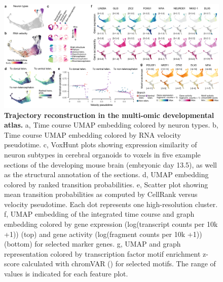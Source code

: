 \begin{figure}[h!]
    \centering
	\includegraphics[width=\textwidth]{figures/pando/Figure_S4}
    \caption{\textbf{Trajectory reconstruction in the multi-omic developmental atlas.} a, Time course UMAP embedding colored by neuron types. b, Time course UMAP embedding colored by RNA velocity pseudotime. c, VoxHunt plots showing expression similarity of neuron subtypes in cerebral organoids to voxels in five example sections of the developing mouse brain (embryonic day 13.5),  as well as the structural annotation of the sections. d, UMAP embedding colored by ranked transition probabilities. e, Scatter plot showing mean transition probabilities as computed by CellRank versus velocity pseudotime. Each dot represents one high-resolution cluster. f, UMAP embedding of the integrated time course and graph embedding colored by gene expression (log(transcript counts per 10k +1)) (top) and gene activity (log(fragment counts per 10k +1))  (bottom) for selected marker genes. g, UMAP and graph representation colored by transcription factor motif enrichment z-score calculated with chromVAR (\cite{schep_chromvar_2017}) for selected motifs. The range of values is indicated for each feature plot.}
    \label{fig:regS4}
\end{figure}



